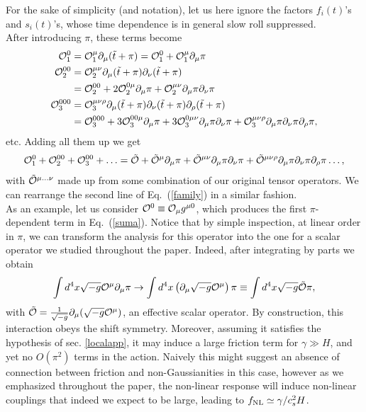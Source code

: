\documentclass[11pt,amsmath,floats,floatfix,nofootinbib,secnumarabic, superscriptaddress, tightenlines]{revtex4}
\newcommand{\beq}{\begin{equation}}
\newcommand{\eeq}{\end{equation}}
\newcommand{\be}{\begin{equation}}
\newcommand{\ee}{\end{equation}}
\newcommand{\calo}{{\cal O}}
\begin{document}
{For the sake of simplicity (and notation), let us here ignore the factors $f_i(t)$'s and $s_i(t)$'s, whose time dependence is in general slow roll suppressed.\\

After introducing $\pi$, these terms become
\begin{subequations}\begin{align}
\calo^{0}_1&=\calo^{\mu}_1\partial_{\mu}(\tilde{t}+\pi)=\calo^{0}_1+\calo^{\mu}_1\partial_{\mu}\pi\\
\calo^{00}_2&=\calo^{\mu\nu}_2\partial_{\mu}(\tilde{t}+\pi)\partial_{\nu}(\tilde{t}+\pi)\\&=\calo^{00}_2+2\calo^{0\mu}_2\partial_{\mu}\pi+\calo^{\mu\nu}_2\partial_{\mu}\pi\partial_{\nu}\pi\nonumber\\
\calo^{000}_3&=\calo^{\mu\nu\rho}_3\partial_{\mu}(\tilde{t}+\pi)\partial_{\nu}(\tilde{t}+\pi)\partial_{\rho}(\tilde{t}+\pi)\\&=\calo^{000}_3+3\calo^{00\mu}_3\partial_{\mu}\pi+3\calo^{0\mu\nu}_3\partial_{\mu}\pi\partial_{\nu}\pi+\calo^{\mu\nu\rho}_3\partial_{\mu}\pi\partial_{\nu}\pi\partial_{\rho}\pi,\nonumber
\end{align}
\end{subequations}
etc. Adding all them up we get
\be\label{suma}
\calo^{0}_1+\calo^{00}_2+\calo^{00}_3+\ldots=\tilde{\calo}+\tilde{\calo}^{\mu}\partial_{\mu}\pi+\tilde{\calo}^{\mu\nu}\partial_{\mu}\pi\partial_{\nu}\pi+\tilde{\calo}^{\mu\nu\rho}\partial_{\mu}\pi\partial_{\nu}\pi\partial_{\rho}\pi \ldots,
\ee
with $\tilde \calo^{\mu\ldots\nu}$ made up from some combination of our original tensor operators. We can rearrange the second line of Eq.~(\ref{family}) in a similar fashion.\\

As an example, let us consider $\calo^0 \equiv \calo_\mu g^{\mu0}$, which produces the first $\pi$-dependent term in Eq.~(\ref{suma}). Notice that by simple inspection, at linear order in $\pi$, we can transform the analysis for this operator into the one for a scalar operator we studied throughout the paper. Indeed, after integrating by parts we obtain
\beq \label{oeff} \int d^4x \sqrt{-g} \calo^\mu \partial_\mu \pi \to \int d^4x \left(\partial_\mu \sqrt{-g} \calo^\mu\right)\pi \equiv \int d^4x \sqrt{-g} \tilde\calo \pi,
\eeq
with $\tilde\calo= \frac{1}{\sqrt{-g}}\partial_{\mu}(\sqrt{-g}{\calo}^{\mu})$, an effective scalar operator. By construction, this interaction obeys the shift symmetry. Moreover, assuming it satisfies the hypothesis of sec. \ref{localapp}, it may induce a large friction term for $\gamma \gg H$, and yet no $O(\pi^2)$ terms in the action. Naively this might suggest an absence of connection between friction and non-Gaussianities in this case, however as we emphasized throughout the paper, the non-linear response will induce non-linear couplings that indeed we expect to be large, leading to $f_{\rm NL} \simeq\gamma/c_s^2H$.


}
\end{document}
